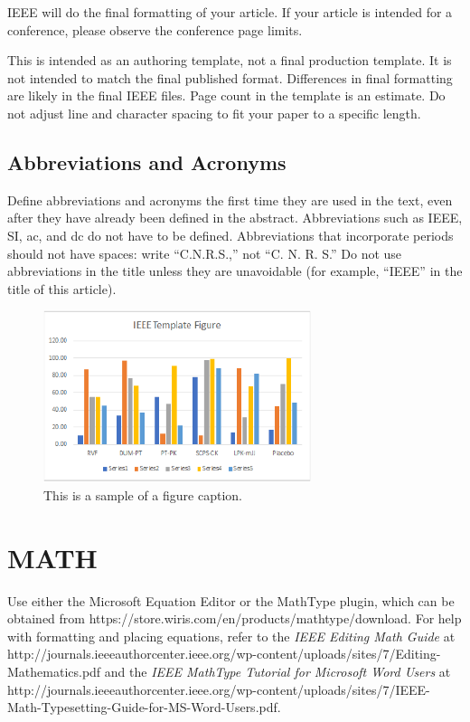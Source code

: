 \documentclass[correspondence]{IEEEtaes}
\begin{document}
IEEE will do the final formatting of your article. If your article is intended for a conference, please observe the conference page limits.

This is intended as an authoring template, not a final production template. It is not intended to match the final published format. Differences in final formatting are likely in the final IEEE files. Page count in the template is an estimate. Do not adjust line and character spacing to fit your paper to a specific length.

\subsection{Abbreviations and Acronyms}

Define abbreviations and acronyms the first time they are used in the text, even after they have already been defined in the abstract. Abbreviations such as IEEE, SI, ac, and dc do not have to be defined. Abbreviations that incorporate periods should not have spaces: write ``C.N.R.S.,'' not ``C. N. R. S.'' Do not use abbreviations in the title unless they are unavoidable (for example, ``IEEE'' in the title of this article).

\begin{figure}
\centerline{\includegraphics[width=18.5pc]{fig1.png}}
\caption{This is a sample of a figure caption.}
\end{figure}

\section{MATH}

Use either the Microsoft Equation Editor or the MathType plugin, which can be obtained from {https://store.wiris.com/en/products/mathtype/download}. For help with formatting and placing equations, refer to the {\it IEEE Editing Math Guide} at {http://journals.ieeeauthorcenter.ieee.org/wp-content/\break uploads/sites/7/Editing-Mathematics.pdf} and the {\it IEEE MathType Tutorial for Microsoft Word Users} at {http://journals.ieeeauthorcenter.ieee.org/wp-content/uploads/sites/7/IEEE-Math-Typesetting-Guide-for-MS-Word-Users.pdf}.
\end{document}
